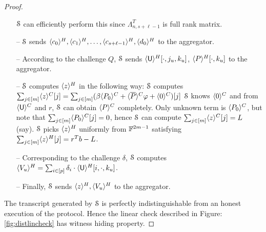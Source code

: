 \begin{proof}
\begin{itemize}
		$\mathcal{S}$ can efficiently perform this since $\Lambda_{n,s+\ell-1}^T$ is full rank matrix.
		\item[--] $\mathcal{S}$ sends $\langle{c_0}\rangle^H, \langle{c_1}\rangle^H,\ldots, \langle{c_{s+\ell-1}}\rangle^H, \langle{d_0}\rangle^H$ to the aggregator.
		\item[--] According to the challenge $Q$, $\mathcal{S}$ sends $\langle{\mathsf{U}}\rangle^H[\cdot, j_u,k_u]$, $\langle{P}\rangle^H[\cdot,k_u]$ to the aggregator.
		\item[--] $\mathcal{S}$ computes $\langle{z}\rangle^H$ in the following way:
		$\mathcal{S}$ computes \\
		$\sum_{j\in[m]}\langle{z}\rangle^C[j] 
		=\sum_{j\in[m]} (\beta \langle{P_0}\rangle^C+\langle{\overline{P}}\rangle^C\varphi + \langle{0}\rangle^C)[j]$
		$\mathcal{S}$ knows $\langle{0}\rangle^C$ and from $\langle{\mathsf{U}}\rangle^C$ and $r$, $\mathcal{S}$ can obtain $\langle{P}\rangle^C$ completely. Only unknown term is $\langle{P_0}\rangle^C$, but note that $\sum_{j\in[m]}\langle{P_0}\rangle^C[j] = 0$, hence $\mathcal{S}$ can compute $\sum_{j\in[m]}\langle{z}\rangle^C[j] = L$ (say).
		$\mathcal{S}$ picks $\langle{z}\rangle^H$ uniformly from $\mathbb{F}^{2m-1}$ satisfying $\sum_{j\in[m]} \langle{z}\rangle^H[j]= r^Tb-L$.
		\item[--] Corresponding to the challenge $\delta$, $\mathcal{S}$ computes $\langle{V_u}\rangle^H = \sum_{i\in[p]} \delta_i\cdot \langle{\mathsf{U}}\rangle^H[i,\cdot, k_u]$.
		\item[--] Finally, $\mathcal{S}$ sends $\langle{z}\rangle^H, \langle{V_u}\rangle^H$ to the aggregator.
	\end{itemize}
	The transcript generated by $\mathcal{S}$ is perfectly indistinguishable from an honest execution of the protocol. Hence the linear check described in Figure: \ref{fig:distlincheck} has witness hiding property.
\end{proof}

